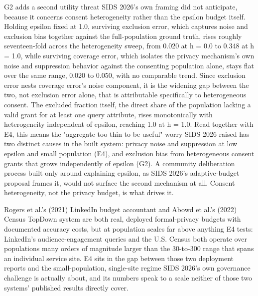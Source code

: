 G2 adds a second utility threat SIDS 2026's own framing did not anticipate, because it concerns consent heterogeneity rather than the epsilon budget itself. Holding epsilon fixed at 1.0, surviving exclusion error, which captures noise and exclusion bias together against the full-population ground truth, rises roughly seventeen-fold across the heterogeneity sweep, from 0.020 at h = 0.0 to 0.348 at h = 1.0, while surviving coverage error, which isolates the privacy mechanism's own noise and suppression behavior against the consenting population alone, stays flat over the same range, 0.020 to 0.050, with no comparable trend. Since exclusion error nests coverage error's noise component, it is the widening gap between the two, not exclusion error alone, that is attributable specifically to heterogeneous consent. The excluded fraction itself, the direct share of the population lacking a valid grant for at least one query attribute, rises monotonically with heterogeneity independent of epsilon, reaching 1.0 at h = 1.0. Read together with E4, this means the "aggregate too thin to be useful" worry SIDS 2026 raised has two distinct causes in the built system: privacy noise and suppression at low epsilon and small population (E4), and exclusion bias from heterogeneous consent grants that grows independently of epsilon (G2). A community deliberation process built only around explaining epsilon, as SIDS 2026's adaptive-budget proposal frames it, would not surface the second mechanism at all. Consent heterogeneity, not the privacy budget, is what drives it.

Rogers et al.'s (2021) LinkedIn budget accountant and Abowd et al.'s (2022) Census TopDown system are both real, deployed formal-privacy budgets with documented accuracy costs, but at population scales far above anything E4 tests: LinkedIn's audience-engagement queries and the U.S. Census both operate over populations many orders of magnitude larger than the 30-to-300 range that spans an individual service site. E4 sits in the gap between those two deployment reports and the small-population, single-site regime SIDS 2026's own governance challenge is actually about, and its numbers speak to a scale neither of those two systems' published results directly cover.

